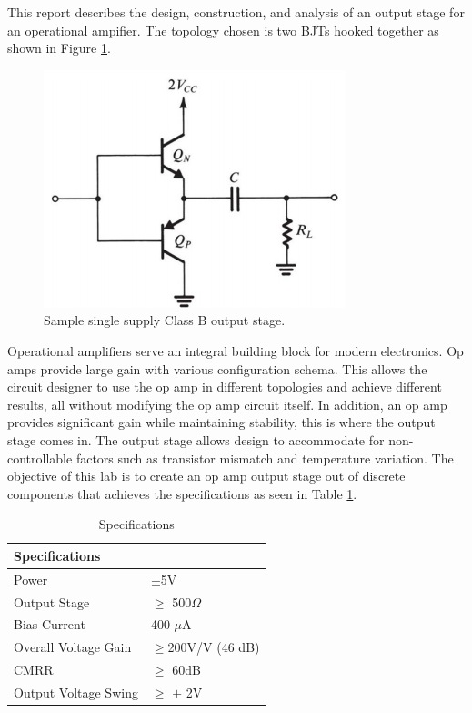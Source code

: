 



This report describes the design, construction, and analysis of an output stage for an operational ampifier. The topology chosen is two BJTs hooked together as shown in Figure \ref{fig:sample}.

\begin{figure}[H]
    \begin{center}
    \includegraphics[scale=.45]{Introduction/outputstage.png}
    \caption{Sample single supply Class B output stage. \cite{b1}}
    \label{fig:sample}
    \end{center}
    
\end{figure}
Operational amplifiers serve an integral building block for modern electronics. Op amps provide large gain with various configuration schema. This allows the circuit designer to use the op amp in different topologies and achieve different results, all without modifying the op amp circuit itself. In addition, an op amp provides significant gain while maintaining stability, this is where the output stage comes in. The output stage allows design to accommodate for non-controllable factors such as transistor mismatch and temperature variation.   The objective of this lab is to create an op amp output stage out of discrete components that achieves the specifications as seen in Table \ref{tab:labspecs}.


\begin{table}[H]
\centering
\caption{Specifications}
\label{tab:labspecs}
\begin{tabular}{|l|l|}
\hline
\textbf{Specifications} &                 \\ \hline
Power                   & $\pm$5V         \\ \hline
Output Stage 			& $\geq$ 500$\Omega$ \\ \hline
Bias Current            & 400 $\mu$A      \\ \hline
Overall Voltage Gain    & $\geq$200V/V (46 dB)  \\ \hline
CMRR                    & $\geq$ 60dB     \\ \hline
Output Voltage Swing    & $\geq$ $\pm$ 2V \\ \hline
\end{tabular}
\end{table}


